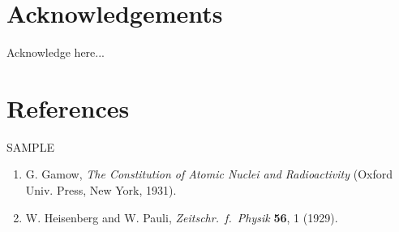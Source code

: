\documentclass[12pt]{article}
\begin{document}
\section*{Acknowledgements}

Acknowledge here...

\section*{References}

SAMPLE

\begin{enumerate}
\item G. Gamow, {\it The Constitution of Atomic Nuclei and
Radioactivity\/} (Oxford Univ. Press, New York, 1931).
\item W. Heisenberg and W. Pauli, {\it Zeitschr.\ f.\ Physik} {\bf 56},
1 (1929).
\end{enumerate}
\end{document}
